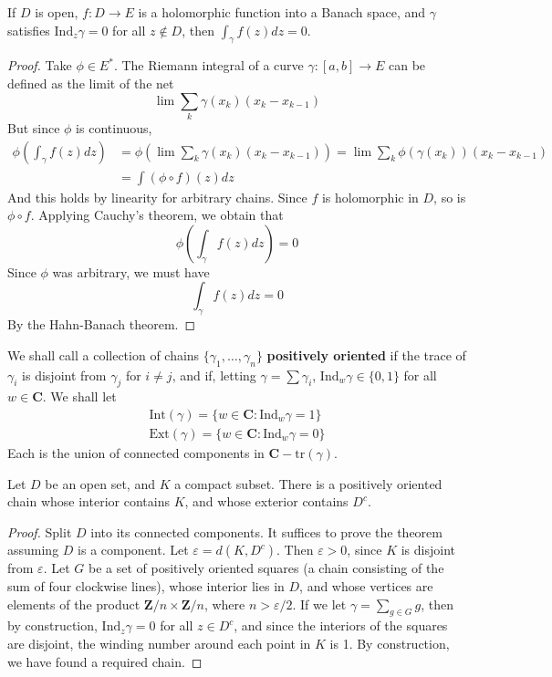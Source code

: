 \begin{lemma} \label{banachcauchy}
    If $D$ is open, $f: D \to E$ is a holomorphic function into a Banach space, and $\gamma$ satisfies $\text{Ind}_z \gamma = 0$ for all $z \not\in D$, then $\int_\gamma f(z) dz = 0$.
\end{lemma}
\begin{proof}
    Take $\phi \in E^*$. The Riemann integral of a curve $\gamma: [a,b] \to E$ can be defined as the limit of the net
    \[ \lim \sum_k \gamma(x_k) (x_k - x_{k-1}) \]
    But since $\phi$ is continuous,
    \begin{align*}
        \phi \left( \int_\gamma f(z) dz \right) &= \phi \left(\lim \sum_k \gamma(x_k) (x_k - x_{k-1}) \right) = \lim \sum_k \phi(\gamma(x_k)) (x_k - x_{k-1})\\
        &= \int (\phi \circ f)(z) dz
    \end{align*}
    And this holds by linearity for arbitrary chains. Since $f$ is holomorphic in $D$, so is $\phi \circ f$. Applying Cauchy's theorem, we obtain that
    \[ \phi \left( \int_\gamma f(z) dz \right) = 0 \]
    Since $\phi$ was arbitrary, we must have
    \[ \int_\gamma f(z) dz = 0 \]
    By the Hahn-Banach theorem.
\end{proof}

We shall call a collection of chains $\{ \gamma_1, \dots, \gamma_n \}$ {\bf positively oriented} if the trace of $\gamma_i$ is disjoint from $\gamma_j$ for $i \neq j$, and if, letting $\gamma = \sum \gamma_i$, $\text{Ind}_w \gamma \in \{ 0,1 \}$ for all $w \in \mathbf{C}$. We shall let
%
\begin{align*}
    \text{Int}(\gamma) = \{ w \in \mathbf{C} : \text{Ind}_w \gamma = 1 \} \\
    \text{Ext}(\gamma) = \{ w \in \mathbf{C} : \text{Ind}_w \gamma = 0 \}
\end{align*}
%
Each is the union of connected components in $\mathbf{C} - \text{tr}(\gamma)$.

\begin{lemma}
    Let $D$ be an open set, and $K$ a compact subset. There is a positively oriented chain whose interior contains $K$, and whose exterior contains $D^c$.
\end{lemma}
\begin{proof}
    Split $D$ into its connected components. It suffices to prove the theorem assuming $D$ is a component. Let $\varepsilon = d(K,D^c)$. Then $\varepsilon > 0$, since $K$ is disjoint from $\varepsilon$. Let $G$ be a set of positively oriented squares (a chain consisting of the sum of four clockwise lines), whose interior lies in $D$, and whose vertices are elements of the product $\mathbf{Z}/n \times \mathbf{Z}/n$, where $n > \varepsilon / 2$. If we let $\gamma = \sum_{g \in G} g$, then by construction, $\text{Ind}_z \gamma = 0$ for all $z \in D^c$, and since the interiors of the squares are disjoint, the winding number around each point in $K$ is 1. By construction, we have found a required chain.
\end{proof}

